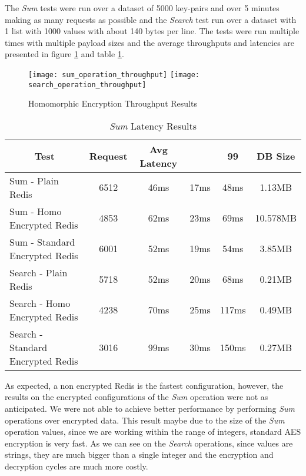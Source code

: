 The \textit{Sum} tests were run over a dataset of 5000 key-pairs and over 5 minutes making as many requests as possible and the \textit{Search} test run over a dataset with 1 list with 1000 values with about 140 bytes per line. The tests were run multiple times with multiple payload sizes and the average throughputs and latencies are presented in figure \ref{fig:homomorphic_encryption_throughput_results} and table \ref{tab:sum_latency_results}.

\begin{figure}[htbp]
  \centering
    {\texttt{[image: sum\_operation\_throughput]}}%
    {\texttt{[image: search\_operation\_throughput]}}%
  \caption{Homomorphic Encryption Throughput Results}
  \label{fig:homomorphic_encryption_throughput_results}
\end{figure}

\begin{table}[ht]
	\caption{\textit{Sum} Latency Results}
	\label{tab:sum_latency_results}
\centering
\begin{tabular}{lccccc}
	\toprule
	\multicolumn{1}{c}{\textbf{Test}} & \pmb{\#}\textbf{Request} & \textbf{Avg Latency} & \pmb{\ensuremath{\sigma}} & \textbf{99}\pmb{\%} & \textbf{DB Size} \\
	\midrule
		Sum - Plain Redis & 6512 & 46ms & 17ms & 48ms & 1.13MB  					\\
		Sum - Homo Encrypted Redis & 4853 & 62ms & 23ms & 69ms & 10.578MB  		\\
		Sum - Standard Encrypted Redis & 6001 & 52ms & 19ms & 54ms & 3.85MB  	\\
		Search - Plain Redis & 5718 & 52ms & 20ms & 68ms & 0.21MB				\\
		Search - Homo Encrypted Redis & 4238	 & 70ms & 25ms & 117ms & 0.49MB		\\
		Search - Standard Encrypted Redis & 3016	 & 99ms & 30ms & 150ms & 0.27MB	\\
	\bottomrule
\end{tabular}
\end{table}

As expected, a non encrypted Redis is the fastest configuration, however, the results on the encrypted configurations of the \textit{Sum} operation were not as anticipated. We were not able to achieve better performance by performing \textit{Sum} operations over encrypted data. This result maybe due to the size of the \textit{Sum} operation values, since we are working within the range of integers, standard \gls{AES} encryption is very fast. As we can see on the \textit{Search} operations, since values are strings, they are much bigger than a single integer and the encryption and decryption cycles are much more costly.

